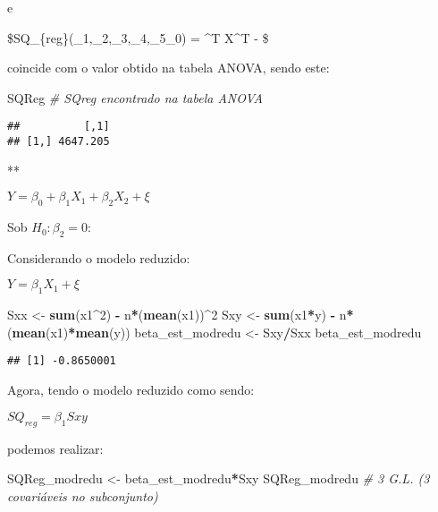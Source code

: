 \documentclass[
]{article}
\newenvironment{Shaded}{\begin{snugshade}}{\end{snugshade}}
\newcommand{\CommentTok}[1]{\textcolor[rgb]{0.56,0.35,0.01}{\textit{#1}}}
\newcommand{\DecValTok}[1]{\textcolor[rgb]{0.00,0.00,0.81}{#1}}
\newcommand{\KeywordTok}[1]{\textcolor[rgb]{0.13,0.29,0.53}{\textbf{#1}}}
\newcommand{\NormalTok}[1]{#1}
\newcommand{\OperatorTok}[1]{\textcolor[rgb]{0.81,0.36,0.00}{\textbf{#1}}}
\newcommand{\StringTok}[1]{\textcolor[rgb]{0.31,0.60,0.02}{#1}}
\begin{document}
e

\$SQ\_\{reg\}(\beta\_1,\beta\_2,\beta\_3,\beta\_4,\beta\_5\textbar{}\beta\_0)
= \widehat{\beta}\^{}T X\^{}T  -
 \$

coincide com o valor obtido na tabela ANOVA, sendo este:

\begin{Shaded}
\begin{Highlighting}[]
\NormalTok{SQReg }\CommentTok{# SQreg encontrado na tabela ANOVA}
\end{Highlighting}
\end{Shaded}

\begin{verbatim}
##          [,1]
## [1,] 4647.205
\end{verbatim}

**

\(Y= \beta_0 + \beta_1X_1 + \beta_2X_2 + \xi\)

Sob \(H_0 : β_2 = 0\):

Considerando o modelo reduzido:

\(Y= \beta_1X_1 + \xi\)

\begin{Shaded}
\begin{Highlighting}[]
\NormalTok{Sxx <-}\StringTok{ }\KeywordTok{sum}\NormalTok{(x1}\OperatorTok{^}\DecValTok{2}\NormalTok{) }\OperatorTok{-}\StringTok{ }\NormalTok{n}\OperatorTok{*}\NormalTok{(}\KeywordTok{mean}\NormalTok{(x1))}\OperatorTok{^}\DecValTok{2}
\NormalTok{Sxy <-}\StringTok{ }\KeywordTok{sum}\NormalTok{(x1}\OperatorTok{*}\NormalTok{y) }\OperatorTok{-}\StringTok{ }\NormalTok{n}\OperatorTok{*}\NormalTok{(}\KeywordTok{mean}\NormalTok{(x1)}\OperatorTok{*}\KeywordTok{mean}\NormalTok{(y))}
\NormalTok{beta_est_modredu <-}\StringTok{ }\NormalTok{Sxy}\OperatorTok{/}\NormalTok{Sxx}
\NormalTok{beta_est_modredu}
\end{Highlighting}
\end{Shaded}

\begin{verbatim}
## [1] -0.8650001
\end{verbatim}

Agora, tendo o modelo reduzido como sendo:

\(SQ_{reg} = \beta_1Sxy\)

podemos realizar:

\begin{Shaded}
\begin{Highlighting}[]
\NormalTok{SQReg_modredu <-}\StringTok{ }\NormalTok{beta_est_modredu}\OperatorTok{*}\NormalTok{Sxy}
\NormalTok{SQReg_modredu }\CommentTok{# 3 G.L. (3 covariáveis no subconjunto)}
\end{Highlighting}
\end{Shaded}
\end{document}
